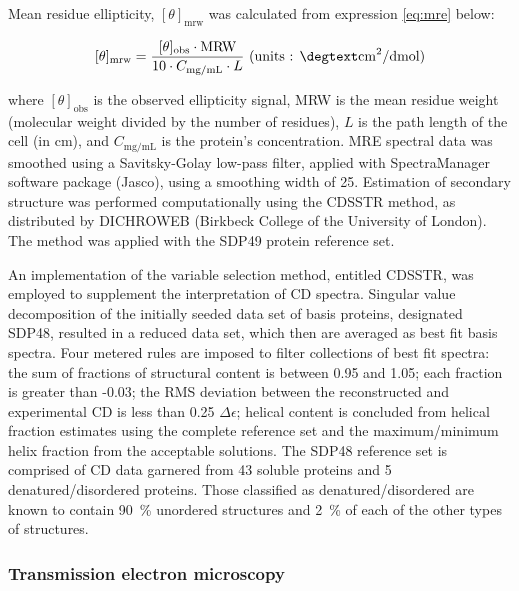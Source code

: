 \begin{refsection}
Mean residue ellipticity, $[\theta]_{\mathrm{mrw}}$ was calculated from
expression \ref{eq:mre} below:

\begin{equation}
    \label{eq:mre}
    [\theta]_{\text{mrw}}=
    \frac{[\theta]_{\text{obs}}\cdot\text{MRW}}{10\cdot{C_\text{mg/mL}}\cdot{L}}
    \text{ (units : \si{\degtext\cm\squared\per\deci\mol})}
\end{equation}

where $[\theta]_{\text{obs}}$ is the observed ellipticity signal, MRW is the
mean residue weight (molecular weight divided by the number of residues), $L$ is
the path length of the cell (in cm), and $C_\text{mg/mL}$ is the protein's
concentration.\cite{Martin2008} MRE spectral data was smoothed using a
Savitsky-Golay low-pass filter, applied with SpectraManager software package
(Jasco), using a smoothing width of 25.\cite{Savitzky1964} Estimation of
secondary structure was performed computationally using the CDSSTR method, as
distributed by DICHROWEB (Birkbeck College of the University of
London).\cite{Whitmore2008} The method was applied with the SDP49 protein
reference set.\cite{Sreerama2000a,Sreerama2000b}

An implementation of the variable selection method,\cite{Manavalan1987} entitled
CDSSTR, was employed to supplement the interpretation of CD spectra. Singular
value decomposition of the initially seeded data set of basis proteins,
designated SDP48, resulted in a reduced data set, which then are averaged as
best fit basis spectra. Four metered rules are imposed to filter collections of
best fit spectra: the sum of fractions of structural content is between 0.95 and
1.05; each fraction is greater than -0.03; the RMS deviation between the
reconstructed and experimental CD is less than 0.25 ${\Delta\epsilon}$; helical
content is concluded from helical fraction estimates using the complete
reference set and the maximum/minimum helix fraction from the acceptable
solutions. The SDP48 reference set is comprised of CD data garnered from 43
soluble proteins and 5 denatured/disordered proteins. Those classified as
denatured/disordered are known to contain \SI{90}{\percent} unordered structures
and \SI{2}{\percent} of each of the other types of
structures.\cite{Sreerama2000b}

\subsubsection{Transmission electron microscopy}
\label{sec:TEM_method}


\end{refsection}
